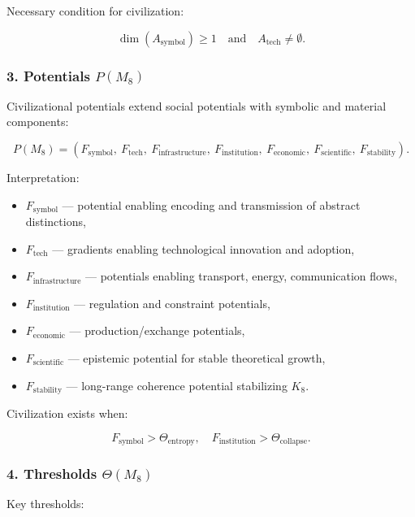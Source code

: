 Necessary condition for civilization:

\[
\dim(A_{\mathrm{symbol}}) \ge 1
\quad\text{and}\quad
A_{\mathrm{tech}}\neq\emptyset.
\]

\subsubsection*{3. Potentials \texorpdfstring{$P(M_8)$}{P(M_8)}}

Civilizational potentials extend social potentials with symbolic and material components:

\[
P(M_8)=
(F_{\mathrm{symbol}},\
F_{\mathrm{tech}},\
F_{\mathrm{infrastructure}},\
F_{\mathrm{institution}},\
F_{\mathrm{economic}},\
F_{\mathrm{scientific}},\
F_{\mathrm{stability}}).
\]

Interpretation:

\begin{itemize}
    \item $F_{\mathrm{symbol}}$ — potential enabling encoding and transmission of abstract distinctions,
    \item $F_{\mathrm{tech}}$ — gradients enabling technological innovation and adoption,
    \item $F_{\mathrm{infrastructure}}$ — potentials enabling transport, energy, communication flows,
    \item $F_{\mathrm{institution}}$ — regulation and constraint potentials,
    \item $F_{\mathrm{economic}}$ — production/exchange potentials,
    \item $F_{\mathrm{scientific}}$ — epistemic potential for stable theoretical growth,
    \item $F_{\mathrm{stability}}$ — long-range coherence potential stabilizing $K_8$.
\end{itemize}

Civilization exists when:

\[
F_{\mathrm{symbol}} > \Theta_{\mathrm{entropy}},
\quad
F_{\mathrm{institution}} > \Theta_{\mathrm{collapse}}.
\]

\subsubsection*{4. Thresholds \texorpdfstring{$\Theta(M_8)$}{\Theta(M_8)}}

Key thresholds:

